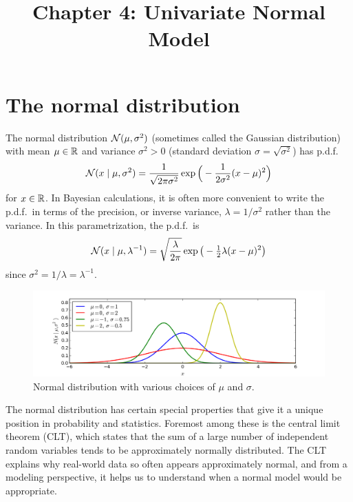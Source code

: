 \documentclass[12pt]{article}
\title{Chapter 4: Univariate Normal Model}
\author{}
\date{}
\begin{document}
\maketitle

\tableofcontents 

\thispagestyle{firststyle}

\vspace{5em}

\section{The normal distribution}

The normal distribution $\mathcal{N}(\mu,\sigma^2)$ (sometimes called the Gaussian distribution) with mean $\mu\in\mathbb{R}$ and variance $\sigma^2 > 0$ (standard deviation $\sigma =\sqrt{\sigma^2}$) has p.d.f.
$$\mathcal{N}(x\mid\mu,\sigma^2) =\frac{1}{\sqrt{2\pi\sigma^2}}\exp\Big(-\frac{1}{2\sigma^2}(x-\mu)^2\Big) $$
for $x\in\mathbb{R}$. In Bayesian calculations, it is often more convenient to write the p.d.f.\ in terms of the precision, or inverse variance, $\lambda = 1/\sigma^2$ rather than the variance. In this parametrization, the p.d.f.\ is
$$\mathcal{N}(x\mid\mu,\lambda^{-1}) =\sqrt{\frac{\lambda}{2\pi}}\exp\big(-\tfrac{1}{2}\lambda (x-\mu)^2\big) $$
since $\sigma^2 = 1/\lambda =\lambda^{-1}$.

\begin{figure}
  \begin{center}
    \includegraphics[width=1\textwidth]{normal.png}
  \end{center}
  \caption{Normal distribution with various choices of $\mu$ and $\sigma$.}
\end{figure}

The normal distribution has certain special properties that give it a unique position in probability and statistics.  Foremost among these is the central limit theorem (CLT), which states that the sum of a large number of independent random variables tends to be approximately normally distributed.  The CLT explains why real-world data so often appears approximately normal, and from a modeling perspective, it helps us to understand when a normal model would be appropriate. 
\end{document}
